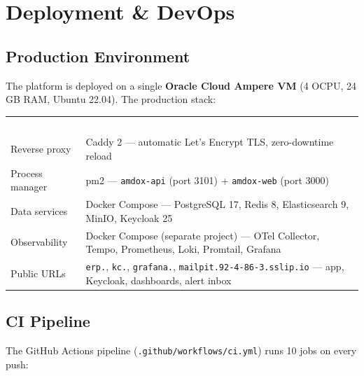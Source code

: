 \documentclass[11pt,a4paper]{article}
\newcommand{\code}[1]{\texttt{\small #1}}
\begin{document}
\section{Deployment \& DevOps}\label{sec:deployment}

\subsection{Production Environment}

The platform is deployed on a single \textbf{Oracle Cloud Ampere VM} (4 OCPU, 24 GB RAM,
Ubuntu 22.04). The production stack:

\begin{table}[H]
\centering\small
\renewcommand{\arraystretch}{1.25}
\begin{tabularx}{\textwidth}{l X}
\toprule
\rowcolor{amdoxnavy}
\textcolor{white}{\textbf{Component}} & \textcolor{white}{\textbf{Details}} \\
Reverse proxy & Caddy 2 --- automatic Let's Encrypt TLS, zero-downtime reload \\
\rowcolor{amdoxlight}
Process manager & pm2 --- \code{amdox-api} (port 3101) + \code{amdox-web} (port 3000) \\
Data services & Docker Compose --- PostgreSQL 17, Redis 8, Elasticsearch 9, MinIO, Keycloak 25 \\
\rowcolor{amdoxlight}
Observability & Docker Compose (separate project) --- OTel Collector, Tempo, Prometheus, Loki, Promtail, Grafana \\
Public URLs & \code{erp.}, \code{kc.}, \code{grafana.}, \code{mailpit.92-4-86-3.sslip.io} --- app, Keycloak, dashboards, alert inbox \\
\bottomrule
\end{tabularx}
\end{table}

\subsection{CI Pipeline}

The GitHub Actions pipeline (\code{.github/workflows/ci.yml}) runs 10 jobs on every push:
\end{document}
